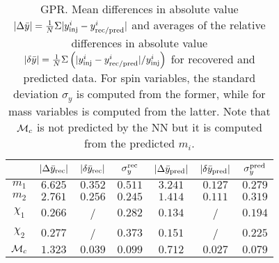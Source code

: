 

\begin{table}
  \caption{\label{GPR_errors}  GPR. Mean differences in absolute value
    $|\Delta \bar{y}|=  \frac{1}{N} \Sigma |y^i_{\rm inj} - y^i_{\rm rec/pred}|$
    and averages of the relative differences in absolute value
    $|\delta \bar{y}| = \frac{1}{N} \Sigma \left( |y^i_{\rm inj} -
    y^i_{\rm rec/pred}|/y^i_{\rm inj} \right) $ for recovered and predicted data.
    For spin variables, the standard deviation $\sigma_y$ is computed from the
    former, while for mass variables is computed from the latter. Note that
    ${\cal{M}}_c$ is not predicted by the NN but it is computed from the
    predicted $m_i$.}
  \begin{center}
  \begin{tabular}{c|ccc|ccc}
  \hline\hline
  & $|\Delta \bar{y}_{\rm rec}|$  & $|\delta \bar{y}_{\rm rec}|$  & $\sigma_y^{\rm rec}$ &
     $|\Delta \bar{y}_{\rm pred}|$ & $|\delta \bar{y}_{\rm pred}|$ & $\sigma_y^{\rm pred}$ \\
  \hline\hline
$m_1$          & $6.625$ & $0.352$ & $0.511$ & $3.241$ & $0.127$ & $0.279$ \\
$m_2$          & $2.761$ & $0.256$ & $0.245$ & $1.414$ & $0.111$ & $0.319$ \\
$\chi_1$       & $0.266$ &  /  & $0.282$ & $0.134$ &  /  & $0.194$ \\
$\chi_2$       & $0.277$ &  /  & $0.373$ & $0.151$ &  /  & $0.225$ \\
\hline
${\cal{M}}_c$  & $1.323$ & $0.039$ & $0.099$ & $0.712$ & $0.027$ & $0.079$ \\
  \hline\hline
  \end{tabular}
  \end{center}
\end{table}

